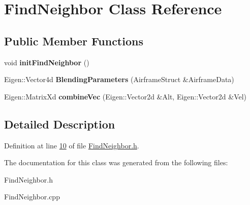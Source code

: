 \hypertarget{class_find_neighbor}{}\section{Find\+Neighbor Class Reference}
\label{class_find_neighbor}
\subsection*{Public Member Functions}
\begin{DoxyCompactItemize}
\item 
\mbox{\label{class_find_neighbor_a749dad6095d8e0e62dd5ba11abdd7500}} 
void {\bfseries init\+Find\+Neighbor} ()
\item 
\mbox{\label{class_find_neighbor_a661260e53f2343fb679f3eefc8f5f02e}} 
Eigen\+::\+Vector4d {\bfseries Blending\+Parameters} (Airframe\+Struct \&Airframe\+Data)
\item 
\mbox{\label{class_find_neighbor_ac0133668987495831b577fefb8bdca50}} 
Eigen\+::\+Matrix\+Xd {\bfseries combine\+Vec} (Eigen\+::\+Vector2d \&Alt, Eigen\+::\+Vector2d \&Vel)
\end{DoxyCompactItemize}


\subsection{Detailed Description}


Definition at line \hyperlink{_find_neighbor_8h_source_l00010}{10} of file \hyperlink{_find_neighbor_8h_source}{Find\+Neighbor.\+h}.



The documentation for this class was generated from the following files\+:\begin{DoxyCompactItemize}
\item 
Find\+Neighbor.\+h\item 
Find\+Neighbor.\+cpp\end{DoxyCompactItemize}
